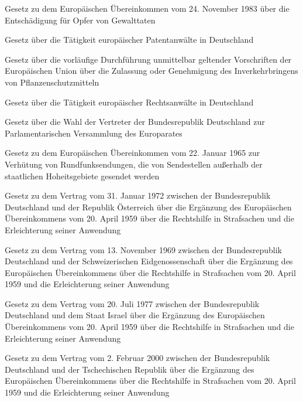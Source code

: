 \item[{EuOEÜbkG}] Gesetz zu dem Europäischen Übereinkommen vom 24. November 1983 über die Entschädigung für Opfer von Gewalttaten

\item[{EuPAG}] Gesetz über die Tätigkeit europäischer Patentanwälte in Deutschland

\item[{EUPflSchMDG}] Gesetz über die vorläufige Durchführung unmittelbar geltender Vorschriften der Europäischen Union über die Zulassung oder Genehmigung des Inverkehrbringens von Pflanzenschutzmitteln

\item[{EuRAG}] Gesetz über die Tätigkeit europäischer Rechtsanwälte in Deutschland

\item[{EuRatWahlG-1990}] Gesetz über die Wahl der Vertreter der Bundesrepublik Deutschland zur Parlamentarischen Versammlung des Europarates

\item[{EuRFVerhÜbkG}] Gesetz zu dem Europäischen Übereinkommen vom 22. Januar 1965 zur Verhütung von Rundfunksendungen, die von Sendestellen außerhalb der staatlichen Hoheitsgebiete gesendet werden

\item[{EuRHiAUTÜbkErgVtrG}] Gesetz zu dem Vertrag vom 31. Januar 1972 zwischen der Bundesrepublik Deutschland und der Republik Österreich über die Ergänzung des Europäischen Übereinkommens vom 20. April 1959 über die Rechtshilfe in Strafsachen und die Erleichterung seiner Anwendung

\item[{EuRHiCHEÜbkErgVtrG}] Gesetz zu dem Vertrag vom 13. November 1969 zwischen der Bundesrepublik Deutschland und der Schweizerischen Eidgenossenschaft über die Ergänzung des Europäischen Übereinkommens über die Rechtshilfe in Strafsachen vom 20. April 1959 und die Erleichterung seiner Anwendung

\item[{EuRHiISRÜbkErgVtrG}] Gesetz zu dem Vertrag vom 20. Juli 1977 zwischen der Bundesrepublik Deutschland und dem Staat Israel über die Ergänzung des Europäischen Übereinkommens vom 20. April 1959 über die Rechtshilfe in Strafsachen und die Erleichterung seiner Anwendung

\item[{EuRHiÜbkErgVtrCZEG}] Gesetz zu dem Vertrag vom 2. Februar 2000 zwischen der Bundesrepublik Deutschland und der Tschechischen Republik über die Ergänzung des Europäischen Übereinkommens über die Rechtshilfe in Strafsachen vom 20. April 1959 und die Erleichterung seiner Anwendung

